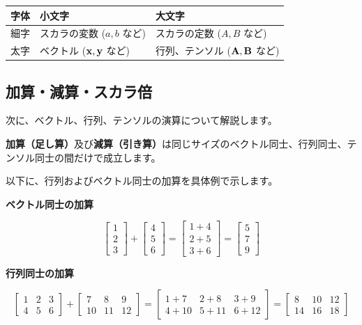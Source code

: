 \begin{center}
\begin{tabular}{|l|l|l|}
\hline
字体 & 小文字 & 大文字 \\
\hline
細字 & スカラの変数 ($a, b$ など) & スカラの定数 ($A, B$ など) \\
太字 & ベクトル (${\bf x}, {\bf y}$ など) & 行列、テンソル (${\bf A}, {\bf B}$ など) \\
\hline
\end{tabular}
\end{center}


\subsection{加算・減算・スカラ倍}


次に、ベクトル、行列、テンソルの演算について解説します。

\textbf{加算（足し算）}及び\textbf{減算（引き算）}は同じサイズのベクトル同士、行列同士、テンソル同士の間だけで成立します。

以下に、行列およびベクトル同士の加算を具体例で示します。


\textbf{ベクトル同士の加算}

\[
\begin{bmatrix}
1 \\
2 \\
3
\end{bmatrix}+\begin{bmatrix}
4 \\
5 \\
6
\end{bmatrix}=\begin{bmatrix}
1 + 4 \\
2 + 5 \\
3 + 6
\end{bmatrix}=\begin{bmatrix}
5 \\
7 \\
9
\end{bmatrix}
\]


\textbf{行列同士の加算}

\[
\begin{bmatrix}
1 & 2 & 3 \\
4 & 5 & 6
\end{bmatrix}+\begin{bmatrix}
7 & 8 & 9 \\
10 & 11 & 12
\end{bmatrix}=\begin{bmatrix}
1+7 & 2+8 & 3+9 \\
4+10 & 5+11 & 6+12
\end{bmatrix}=\begin{bmatrix}
8 & 10 & 12 \\
14 & 16 & 18
\end{bmatrix}
\]


